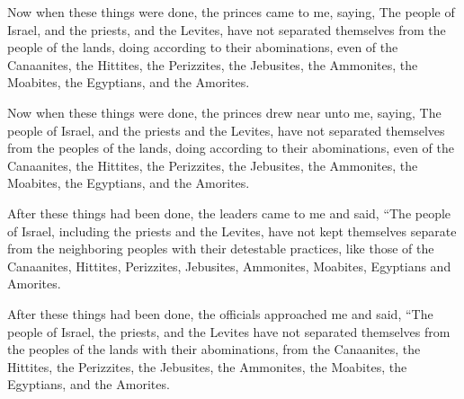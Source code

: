 			Now when these things were done, the princes came to me, saying, The people of Israel, and the priests, and the Levites, have not separated themselves from the people of the lands, doing according to their abominations, even of the Canaanites, the Hittites, the Perizzites, the Jebusites, the Ammonites, the Moabites, the Egyptians, and the Amorites.

			\begin{versebox}
					\item[BHS] 
					\item[LXX] 
					\item[ASV] Now when these things were done, the princes drew near unto me, saying, The people of Israel, and the priests and the Levites, have not separated themselves from the peoples of the lands, doing according to their abominations, even of the Canaanites, the Hittites, the Perizzites, the Jebusites, the Ammonites, the Moabites, the Egyptians, and the Amorites.
					\item[NIV] After these things had been done, the leaders came to me and said, “The people of Israel, including the priests and the Levites, have not kept themselves separate from the neighboring peoples with their detestable practices, like those of the Canaanites, Hittites, Perizzites, Jebusites, Ammonites, Moabites, Egyptians and Amorites.
					\item[NRSV] After these things had been done, the officials approached me and said, “The people of Israel, the priests, and the Levites have not separated themselves from the peoples of the lands with their abominations, from the Canaanites, the Hittites, the Perizzites, the Jebusites, the Ammonites, the Moabites, the Egyptians, and the Amorites.
			\end{versebox}

